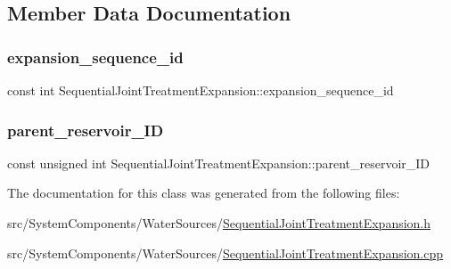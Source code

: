 \subsection{Member Data Documentation}
\mbox{\label{classSequentialJointTreatmentExpansion_adeaf6ba2bcfc4c024e332764144e3021}} 
\subsubsection{\texorpdfstring{expansion\+\_\+sequence\+\_\+id}{expansion\_sequence\_id}}
{\footnotesize\ttfamily const int Sequential\+Joint\+Treatment\+Expansion\+::expansion\+\_\+sequence\+\_\+id}

\mbox{\label{classSequentialJointTreatmentExpansion_a43b9e27138606bbbf8e5ef0279232a0a}} 
\subsubsection{\texorpdfstring{parent\+\_\+reservoir\+\_\+\+ID}{parent\_reservoir\_ID}}
{\footnotesize\ttfamily const unsigned int Sequential\+Joint\+Treatment\+Expansion\+::parent\+\_\+reservoir\+\_\+\+ID}



The documentation for this class was generated from the following files\+:\begin{DoxyCompactItemize}
\item 
src/\+System\+Components/\+Water\+Sources/\mbox{\hyperlink{SequentialJointTreatmentExpansion_8h}{Sequential\+Joint\+Treatment\+Expansion.\+h}}\item 
src/\+System\+Components/\+Water\+Sources/\mbox{\hyperlink{SequentialJointTreatmentExpansion_8cpp}{Sequential\+Joint\+Treatment\+Expansion.\+cpp}}\end{DoxyCompactItemize}
